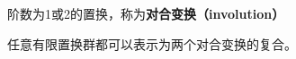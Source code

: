 
\begin{definition}{}
阶数为1或2的置换，称为\textbf{对合变换（involution）}
\end{definition}
\begin{theorem}{}
任意有限置换群都可以表示为两个对合变换的复合。
\end{theorem}



